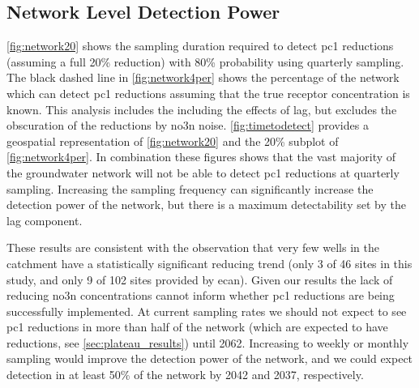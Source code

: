 \subsection[network detection power]{Network Level Detection Power} \label{sec:network_results}

\autoref{fig:network20} shows the sampling duration required to detect \gls{pc1} reductions (assuming a full 20\% reduction) with 80\% probability using quarterly sampling. The black dashed line in \autoref{fig:network4per} shows the percentage of the network which can detect \gls{pc1} reductions assuming that the true receptor concentration is known. This analysis includes the including the effects of lag, but excludes the obscuration of the reductions by \gls{no3n} noise.
\autoref{fig:timetodetect} provides a geospatial representation of \autoref{fig:network20} and the 20\% subplot of \autoref{fig:network4per}. In combination these figures shows that the vast majority of the groundwater network will not be able to detect \gls{pc1} reductions at quarterly sampling. Increasing the sampling frequency can significantly increase the detection power of the network, but there is a maximum detectability set by the lag component.

These results are consistent with the observation that very few wells in the catchment have a statistically significant reducing trend (only 3 of 46 sites in this study, and only 9 of 102 sites provided by \gls{ecan}). Given our results the lack of reducing \gls{no3n} concentrations cannot inform whether \gls{pc1} reductions are being successfully implemented. At current sampling rates we should not expect to see \gls{pc1} reductions in more than half of the network (which are expected to have reductions, see \autoref{sec:plateau_results}) until 2062. Increasing to weekly or monthly sampling would improve the detection power of the network, and we could expect detection in at least 50\% of the network by 2042 and 2037, respectively.


\begin{landscape}




\end{landscape}

